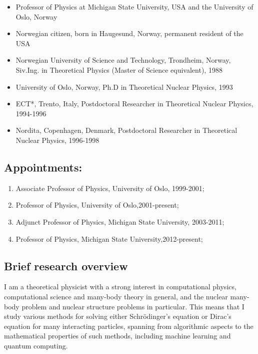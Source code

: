 \documentclass[%
oneside,                 %
final,                   %
10pt]{article}
\begin{document}
\begin{itemize}
\item Professor of Physics at Michigan State University, USA and the University of Oslo, Norway

\item Norwegian citizen, born in Haugesund, Norway, permanent resident of the USA

\item Norwegian University of Science and Technology, Trondheim, Norway,  Siv.Ing. in Theoretical Physics (Master of Science equivalent),  1988 

\item University of Oslo, Norway,  Ph.D in Theoretical Nuclear Physics, 1993

\item ECT*, Trento, Italy,  Postdoctoral Researcher in Theoretical Nuclear Physics,  1994-1996

\item Nordita, Copenhagen, Denmark, Postdoctoral Researcher in Theoretical Nuclear Physics, 1996-1998
\end{itemize}

\noindent
\subsection*{Appointments:}

\begin{enumerate}
\item Associate Professor of Physics, University of Oslo, 1999-2001;

\item Professor of Physics, University of Oslo,2001-present;

\item Adjunct Professor of Physics, Michigan State University, 2003-2011;

\item Professor of Physics, Michigan State University,2012-present;
\end{enumerate}

\noindent
\subsection*{Brief research overview}

I am a theoretical physicist with a strong interest in 
computational physics, computational science and many-body theory in general, and 
the nuclear many-body problem and nuclear structure problems in particular. 
This means that I study various methods for solving either Schrödinger's equation or 
Dirac's equation for many interacting particles, spanning from 
algorithmic aspects to the mathematical properties of such methods, including machine learning and quantum computing. 
\end{document}
